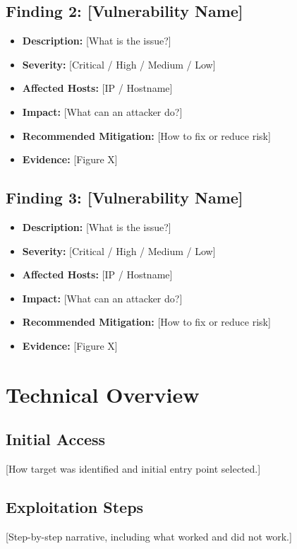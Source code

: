 \documentclass[11pt]{article}
\begin{document}
\subsection*{Finding 2: [Vulnerability Name]}
\begin{itemize}
  \item \textbf{Description:} [What is the issue?]
  \item \textbf{Severity:} [Critical / High / Medium / Low]
  \item \textbf{Affected Hosts:} [IP / Hostname]
  \item \textbf{Impact:} [What can an attacker do?]
  \item \textbf{Recommended Mitigation:} [How to fix or reduce risk]
  \item \textbf{Evidence:} [Figure X]
\end{itemize}

\subsection*{Finding 3: [Vulnerability Name]}
\begin{itemize}
  \item \textbf{Description:} [What is the issue?]
  \item \textbf{Severity:} [Critical / High / Medium / Low]
  \item \textbf{Affected Hosts:} [IP / Hostname]
  \item \textbf{Impact:} [What can an attacker do?]
  \item \textbf{Recommended Mitigation:} [How to fix or reduce risk]
  \item \textbf{Evidence:} [Figure X]
\end{itemize}

\section{Technical Overview}

\subsection{Initial Access}
[How target was identified and initial entry point selected.]

\subsection{Exploitation Steps}
[Step-by-step narrative, including what worked and did not work.]
\end{document}
